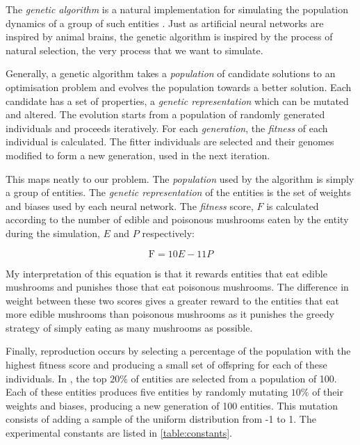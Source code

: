 \documentclass[12pt,a4paper]{report}
\begin{document}
The \emph{genetic algorithm} is a natural implementation for simulating the population dynamics of a group of such entities \citep{holland1992adaptation}. Just as artificial neural networks are inspired by animal brains, the genetic algorithm is inspired by the process of natural selection, the very process that we want to simulate. 

Generally, a genetic algorithm takes a \emph{population} of candidate solutions to an optimisation problem and evolves the population towards a better solution. Each candidate has a set of properties, a \emph{genetic representation} which can be mutated and altered. The evolution starts from a population of randomly generated individuals and proceeds iteratively. For each \emph{generation}, the \emph{fitness} of each individual is calculated. The fitter individuals are selected and their genomes modified to form a new generation, used in the next iteration.

This maps neatly to our problem. The \emph{population} used by the algorithm is simply a group of entities. The \emph{genetic representation} of the entities is the set of weights and biases used by each neural network. The \emph{fitness} score, $F$ is calculated according to the number of edible and poisonous mushrooms eaten by the entity during the simulation, $E$ and $P$ respectively:

\begin{equation}
\label{equation:fitness}
\mathrm{F} = 10 E - 11 P
\end{equation}

My interpretation of this equation is that it rewards entities that eat edible mushrooms and punishes those that eat poisonous mushrooms. The difference in weight between these two scores gives a greater reward to the entities that eat more edible mushrooms than poisonous mushrooms as it punishes the greedy strategy of simply eating as many mushrooms as possible.

Finally, reproduction occurs by selecting a percentage of the population with the highest fitness score and producing a small set of offspring for each of these individuals. In \cite{Cangelosi1998}, the top $20\%$ of entities are selected from a population of 100. Each of these entities produces five entities by randomly mutating $10\%$ of their weights and biases, producing a new generation of 100 entities. This mutation consists of adding a sample of the uniform distribution from -1 to 1. The experimental constants are listed in \cref{table:constants}.
\end{document}
